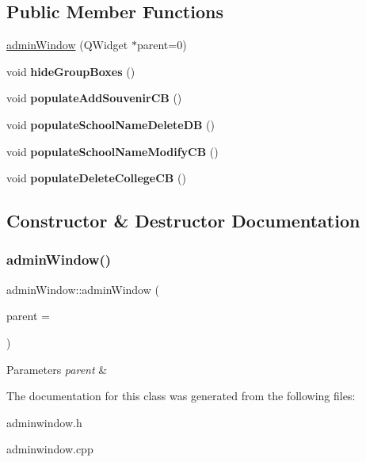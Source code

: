 \subsection*{Public Member Functions}
\begin{DoxyCompactItemize}
\item 
\hyperlink{classadmin_window_aa87a28958c1a314408df44e88c886ac5}{admin\+Window} (Q\+Widget $\ast$parent=0)
\item 
\mbox{\label{classadmin_window_a95731b5313335ada974c1a4f2b7bc910}} 
void {\bfseries hide\+Group\+Boxes} ()
\item 
\mbox{\label{classadmin_window_a83b7645ca3b45881681140f30d87d98a}} 
void {\bfseries populate\+Add\+Souvenir\+CB} ()
\item 
\mbox{\label{classadmin_window_a38fa5862c1ea91c2eb095339f7357078}} 
void {\bfseries populate\+School\+Name\+Delete\+DB} ()
\item 
\mbox{\label{classadmin_window_aa2b416fe8b1d0848fc385102c1777a9c}} 
void {\bfseries populate\+School\+Name\+Modify\+CB} ()
\item 
\mbox{\label{classadmin_window_a273e88bb1de74c5929fa58982fc527b0}} 
void {\bfseries populate\+Delete\+College\+CB} ()
\end{DoxyCompactItemize}


\subsection{Constructor \& Destructor Documentation}
\mbox{\label{classadmin_window_aa87a28958c1a314408df44e88c886ac5}} 
\subsubsection{\texorpdfstring{admin\+Window()}{adminWindow()}}
{\footnotesize\ttfamily admin\+Window\+::admin\+Window (\begin{DoxyParamCaption}\item[{Q\+Widget $\ast$}]{parent = {} }\end{DoxyParamCaption})\hspace{0.3cm}{\ttfamily [explicit]}}


\begin{DoxyParams}{Parameters}
{\em parent} & \\
\hline
\end{DoxyParams}


The documentation for this class was generated from the following files\+:\begin{DoxyCompactItemize}
\item 
adminwindow.\+h\item 
adminwindow.\+cpp\end{DoxyCompactItemize}
